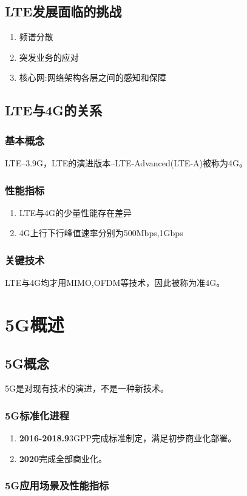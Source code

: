 \documentclass{report}
\begin{document}
	\section{LTE发展面临的挑战}
	\begin{enumerate}
		\item 频谱分散
		\item 突发业务的应对
		\item 核心网:网络架构各层之间的感知和保障
	\end{enumerate}
	\section{LTE与4G的关系}
	\subsection{基本概念}
	LTE--3.9G，LTE的演进版本--LTE-Advanced(LTE-A)被称为4G。
	\subsection{性能指标}
	\begin{enumerate}
		\item 	LTE与4G的少量性能存在差异
		\item 4G上行下行峰值速率分别为500Mbps,1Gbps
	\end{enumerate}
	\subsection{关键技术}
	LTE与4G均才用MIMO,OFDM等技术，因此被称为准4G。
	
	\chapter{5G概述}
	\section{5G概念}
	5G是对现有技术的演进，不是一种新技术。
	\subsection{5G标准化进程}
	\begin{enumerate}
		\item \textbf{2016-2018.9}3GPP完成标准制定，满足初步商业化部署。
		\item \textbf{2020}完成全部商业化。
	\end{enumerate}
	\subsection{5G应用场景及性能指标}
\end{document}
